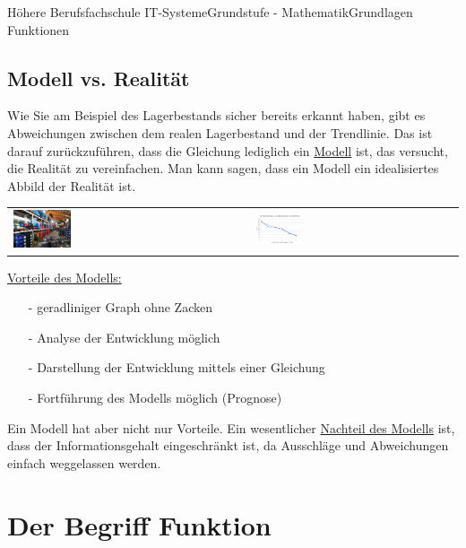 \documentclass[11pt,twocolumn,oneside,openany,headings=optiontotoc,11pt,numbers=noenddot]{article}
\begin{document}
\begin{worksheet}{Höhere Berufsfachschule IT-Systeme}{Grundstufe - Mathematik}{Grundlagen Funktionen}
		\subsection{Modell vs. Realität}
		Wie Sie am Beispiel des Lagerbestands sicher bereits erkannt haben, gibt es Abweichungen zwischen dem realen Lagerbestand und der Trendlinie. Das ist darauf zurückzuführen, dass die Gleichung lediglich ein \underline{Modell} ist, das versucht, die Realität zu vereinfachen. Man kann sagen, dass ein Modell ein idealisiertes Abbild der Realität ist.\\
		\par\bigskip\noindent
		\begin{tabularx}{0.45\textwidth}{XX}
			\includegraphics[width=0.25\textwidth]{../99_Bilder/lager.jpg} & \includegraphics[width=0.25\textwidth]{../99_Bilder/bier2.jpg}
		\end{tabularx}
		\par\bigskip\noindent
		\underline{Vorteile des Modells:}
		\begin{itemize}
			\item[-] geradliniger Graph ohne Zacken
			\item[-] Analyse der Entwicklung möglich
			\item[-] Darstellung der Entwicklung mittels einer Gleichung
			\item[-] Fortführung des Modells möglich (Prognose)
		\end{itemize}
		Ein Modell hat aber nicht nur Vorteile. Ein wesentlicher \underline{Nachteil des Modells} ist, dass der Informationsgehalt eingeschränkt ist, da Ausschläge und Abweichungen einfach weggelassen werden.
		\newpage
		\section{Der Begriff \glqq{}Funktion\grqq{}}
		\begin{framed}
			\noindent

\end{framed}
\end{worksheet}
\end{document}
